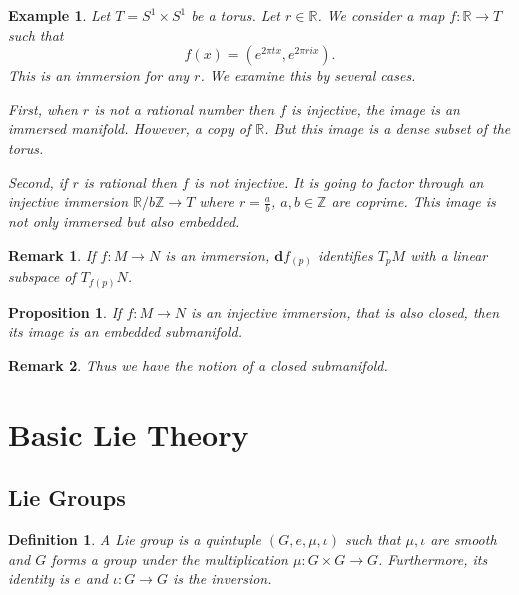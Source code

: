 \documentclass{article}
\newtheorem{proposition}{Proposition}[section]
\newtheorem{definition}{Definition}[section]
\newtheorem{remark}{Remark}[section]
\newtheorem{example}{Example}[section]
\numberwithin{equation}{section}
\begin{document}
\begin{example}
Let $T=S^1\times S^1$ be a torus. Let $r\in\mathbb{R}$. We consider a map $f:\mathbb{R}\to T$ such that
\begin{equation*}
f(x) = (e^{2\pi t x},e^{2\pi ri x}).
\end{equation*}
This is an immersion for any $r$. We examine this by several cases. \\
\par First, when $r$ is not a rational number then $f$ is injective, the image is an immersed manifold. However, a copy of $\mathbb{R}$. But this image is a dense subset of the torus. \\
\par Second, if $r$ is rational then $f$ is not injective. It is going to factor through an injective immersion $\mathbb{R}/b\mathbb{Z}\to T$ where $r={\frac a b}$, $a,b\in\mathbb{Z}$ are coprime. This image is not only immersed but also embedded. \\
\end{example}

\begin{remark}
If $f:M\to N$ is an immersion, $\mathbf{d}f_(p)$ identifies $T_pM$ with a linear subspace of $T_{f(p)}N$. 
\end{remark}

\begin{proposition}
If $f:M\to N$ is an injective immersion, that is also closed, then its image is an embedded submanifold. 
\end{proposition}

\begin{remark}
Thus we have the notion of a closed submanifold. 
\end{remark}


\section{Basic Lie Theory}

\subsection{Lie Groups}

\begin{definition}
A Lie group is a quintuple $(G,e,\mu,\iota)$ such that $\mu,\iota$ are smooth and $G$ forms a group under the multiplication $\mu:G\times G\to G$. Furthermore, its identity is $e$ and $\iota:G\to G$ is the inversion.  
\end{definition}
\end{document}
